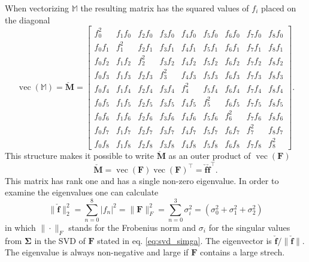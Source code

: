 When vectorizing $\mathbb{M}$ the resulting matrix has the squared values of $f_i$ placed on the diagonal
\[
\operatorname{vec}(\mathbb{M})= \mathbf{\check{M}} = \begin{bmatrix} f_0^2 & f_1f_0 & f_2f_0 & f_3f_0 & f_4f_0 & f_5f_0 & f_6f_0 & f_7f_0 & f_8f_0 \\ f_0f_1 & f_1^2 & f_2f_1 & f_3f_1 & f_4f_1 & f_5f_1 & f_6f_1 & f_7f_1 & f_8f_1 \\ f_0f_2 & f_1f_2 & f_2^2 & f_3f_2 & f_4f_2 & f_5f_2 & f_6f_2 & f_7f_2 & f_8f_2 \\ f_0f_3 & f_1f_3 & f_2f_3 & f_3^2 & f_4f_3 & f_5f_3 & f_6f_3 & f_7f_3 & f_8f_3 \\ f_0f_4 & f_1f_4 & f_2f_4 & f_3f_4 & f_4^2 & f_5f_4 & f_6f_4 & f_7f_4 & f_8f_4 \\ f_0f_5 & f_1f_5 & f_2f_5 & f_3f_5 & f_4f_5 & f_5^2 & f_6f_5 & f_7f_5 & f_8f_5 \\ f_0f_6 & f_1f_6 & f_2f_6 & f_3f_6 & f_4f_6 & f_5f_6 & f_6^2 & f_7f_6 & f_8f_6 \\ f_0f_7 & f_1f_7 & f_2f_7 & f_3f_7 & f_4f_7 & f_5f_7 & f_6f_7 & f_7^2 & f_8f_7 \\ f_0f_8 & f_1f_8 & f_2f_8 & f_3f_8 & f_4f_8 & f_5f_8 & f_6f_8 & f_7f_8 & f_8^2 \end{bmatrix}.
\]
This structure makes it possible to write $\mathbf{\check{M}}$ as an outer product of $\operatorname{vec}(\mathbf{F})$
\[
\mathbf{\check{M}}= \operatorname{vec}(\mathbf{F})\operatorname{vec}(\mathbf{F})^\intercal = \mathbf{\check{f}} \mathbf{\check{f}}^\intercal.
\]
This matrix has rank one and has a single non-zero eigenvalue. In order to examine the eigenvalues one can calculate
\[
\| \mathbf{\check{f}} \|^{2}_{2} = \sum_{n=0}^8 | f_n |^2 = \| \mathbf{F} \|^{2}_{F} = \sum_{n=0}^3 \sigma^2_i = \left( \sigma_0^2 + \sigma_1^2 + \sigma_2^2 \right)
\]
in which $\|\cdot\|_F$ stands for the Frobenius norm and $\sigma_i$ for the singular values from $\mathbf{\Sigma}$ in the SVD of $\mathbf{F}$ stated in eq. \ref{eq:svd_simga}. The eigenvector is $\mathbf{\check{f}} / \| \mathbf{\check{f}} \|$. The eigenvalue is always non-negative and large if $\mathbf{F}$ contains a large strech.

